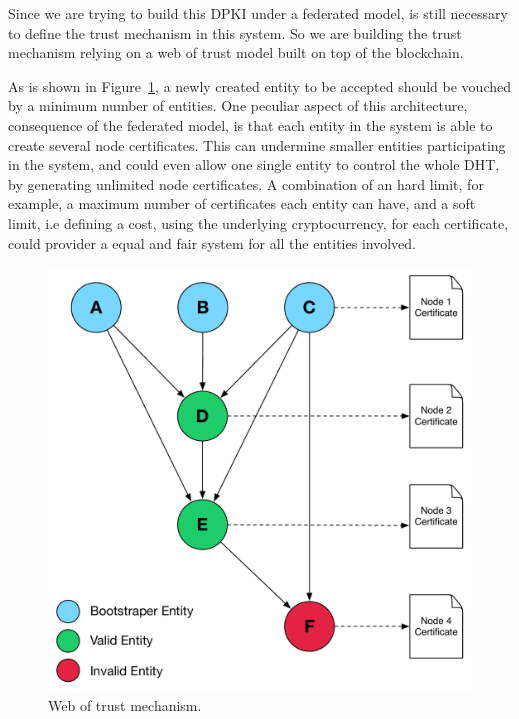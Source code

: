 Since we are trying to build this \ac{DPKI} under a federated model, is still necessary to define the trust mechanism in this system.
So we are building the trust mechanism relying on a web of trust model built on top of the blockchain.

As is shown in Figure~\ref{fig:web-of-trust-architecture}, a newly created entity to be accepted should be vouched by a minimum number of entities.
One peculiar aspect of this architecture, consequence of the federated model, is that each entity in the system is able to create several node certificates.
This can undermine smaller entities participating in the system, and could even allow one single entity to control the whole \ac{DHT}, by generating unlimited node certificates.
A combination of an hard limit, for example, a maximum number of certificates each entity can have, and a soft limit, i.e defining a cost, using the underlying cryptocurrency, for each certificate, could provider a equal and fair system for all the entities involved.

\begin{figure}[htb]
  \centering
  \includegraphics[scale=0.5]{Figures/web-trust-main.pdf}
  \caption{Web of trust mechanism.}
\label{fig:web-of-trust-architecture}
\end{figure}

